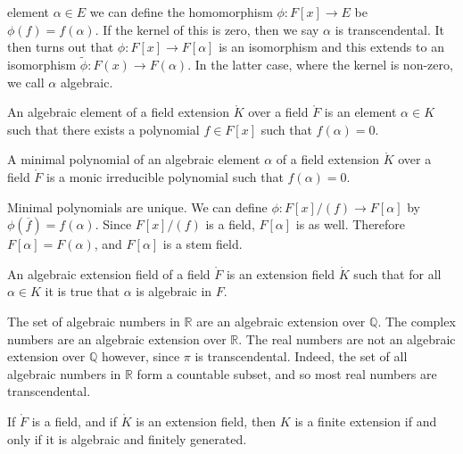 \documentclass{article}                                                        %
\begin{document}
        element $\alpha\in{E}$ we can define the homomorphism
        $\phi:F[x]\rightarrow{E}$ be $\phi(f)=f(\alpha)$. If the kernel of this
        is zero, then we say $\alpha$ is transcendental. It then turns out that
        $\phi:F[x]\rightarrow{F}[\alpha]$ is an isomorphism and this extends
        to an isomorphism $\tilde{\phi}:F(x)\rightarrow{F}(\alpha)$. In the
        latter case, where the kernel is non-zero, we call $\alpha$ algebraic.
        \begin{definition}
            An algebraic element of a field extension $\ring{K}$ over a field
            $\ring{F}$ is an element $\alpha\in{K}$ such that there exists a
            polynomial $f\in{F}[x]$ such that $f(\alpha)=0$.
        \end{definition}
        \begin{definition}
            A minimal polynomial of an algebraic element $\alpha$ of a field
            extension $\ring{K}$ over a field $\ring{F}$ is a monic irreducible
            polynomial such that $f(\alpha)=0$.
        \end{definition}
        Minimal polynomials are unique. We can define
        $\phi:F[x]/(f)\rightarrow{F}[\alpha]$ by
        $\phi(\overline{f})=f(\alpha)$. Since $F[x]/(f)$ is a field, $F[\alpha]$
        is as well. Therefore $F[\alpha]=F(\alpha)$, and $F[\alpha]$ is a stem
        field.
        \begin{definition}
            An algebraic extension field of a field $\ring{F}$ is an extension
            field $\ring{K}$ such that for all $\alpha\in{K}$ it is true that
            $\alpha$ is algebraic in $F$.
        \end{definition}
        \begin{example}
            The set of algebraic numbers in $\mathbb{R}$ are an algebraic
            extension over $\mathbb{Q}$. The complex numbers are an algebraic
            extension over $\mathbb{R}$. The real numbers are not an algebraic
            extension over $\mathbb{Q}$ however, since $\pi$ is transcendental.
            Indeed, the set of all algebraic numbers in $\mathbb{R}$ form a
            countable subset, and so most real numbers are transcendental.
        \end{example}
        \begin{theorem}
            If $\ring{F}$ is a field, and if $\ring{K}$ is an extension field,
            then $K$ is a finite extension if and only if it is algebraic and
            finitely generated.
        \end{theorem}
\end{document}
